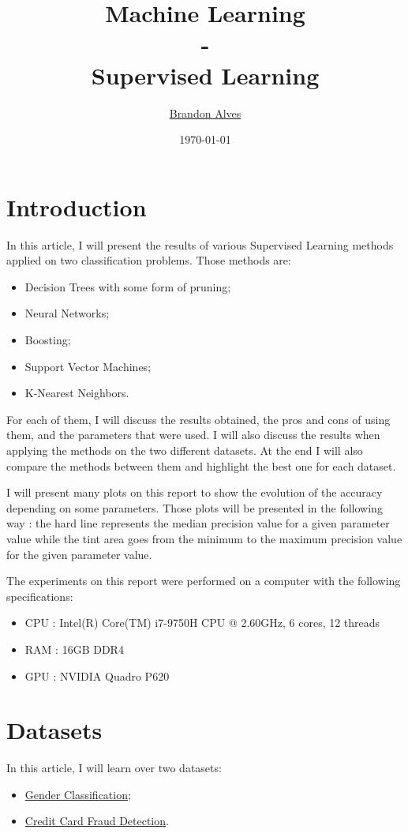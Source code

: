 \documentclass[10pt]{article}
\title{
	Machine Learning
	\\-\\
	Supervised Learning
}
\author{
	\href{mailto:brandon.alves@gatech.edu}{Brandon Alves}
}
\date{\today}
\begin{document}
	\maketitle
	\tableofcontents
	\listoffigures
	\newpage
	\section{Introduction}
		In this article, I will present the results of various Supervised Learning methods applied on two classification problems. Those methods are:
		\begin{itemize}
			\item Decision Trees with some form of pruning;
			\item Neural Networks;
			\item Boosting;
			\item Support Vector Machines;
			\item K-Nearest Neighbors.
		\end{itemize}
		For each of them, I will discuss the results obtained, the pros and cons of using them, and the parameters that were used. I will also discuss the results when applying the methods on the two different datasets. At the end I will also compare the methods between them and highlight the best one for each dataset.

		I will present many plots on this report to show the evolution of the accuracy depending on some parameters. Those plots will be presented in the following way : the hard line represents the median precision value for a given parameter value while the tint area goes from the minimum to the maximum precision value for the given parameter value.

		The experiments on this report were performed on a computer with the following specifications:
		\begin{itemize}
			\item CPU : Intel(R) Core(TM) i7-9750H CPU @ 2.60GHz, 6 cores, 12 threads
			\item RAM : 16GB DDR4
			\item GPU : NVIDIA Quadro P620
		\end{itemize}
	\section{Datasets}
		In this article, I will learn over two datasets:
		\begin{itemize}
			\item \href{https://www.kaggle.com/datasets/elakiricoder/gender-classification-dataset}{Gender Classification};
			\item \href{https://www.kaggle.com/code/sngkadam/credit-card-fraud-detection/data}{Credit Card Fraud Detection}.
		\end{itemize}
\end{document}
